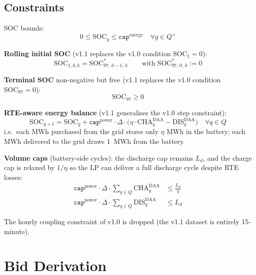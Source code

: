 \documentclass{article}
\numberwithin{equation}{subsection}
\begin{document}
\subsection*{Constraints}
SOC bounds:
\begin{equation}
0 \leq \mathrm{SOC}_q \leq \texttt{cap}^{\text{energy}} \quad \forall q \in Q^+
\end{equation}

\textbf{Rolling initial SOC} (v1.1 replaces the v1.0 condition \(\mathrm{SOC}_1 = 0\)):
\begin{equation}
\mathrm{SOC}_{1,d,k} = \mathrm{SOC}^{*}_{97,\,d-1,\,k} \qquad \text{with } \mathrm{SOC}^{*}_{97,\,0,\,k} := 0
\end{equation}

\textbf{Terminal SOC} non-negative but free (v1.1 replaces the v1.0 condition \(\mathrm{SOC}_{97} = 0\)):
\begin{equation}
\mathrm{SOC}_{97} \geq 0
\end{equation}

\textbf{RTE-aware energy balance} (v1.1 generalises the v1.0 step constraint):
\begin{equation}
\mathrm{SOC}_{q+1} = \mathrm{SOC}_{q}
+ \texttt{cap}^{\text{power}} \cdot \Delta \cdot
\bigl(\eta \cdot \mathrm{CHA}^{\mathrm{DAA}}_q - \mathrm{DIS}^{\mathrm{DAA}}_q \bigr)
\quad \forall q \in Q
\label{eq:soc-step}
\end{equation}
i.e.\ each MWh purchased from the grid stores only \(\eta\) MWh in the battery; each MWh delivered to the grid draws 1~MWh from the battery.

\textbf{Volume caps} (battery-side cycles): the discharge cap remains \(L_d\), and the charge cap is relaxed by \(1/\eta\) so the LP can deliver a full discharge cycle despite RTE losses:
\begin{align}
\texttt{cap}^{\text{power}} \cdot \Delta \cdot \sum_{q \in Q} \mathrm{CHA}^{\mathrm{DAA}}_q &\leq \frac{L_d}{\eta} \\
\texttt{cap}^{\text{power}} \cdot \Delta \cdot \sum_{q \in Q} \mathrm{DIS}^{\mathrm{DAA}}_q &\leq L_d
\end{align}

The hourly coupling constraint of v1.0 is dropped (the v1.1 dataset is entirely 15-minute).


\section{Bid Derivation}
\end{document}
